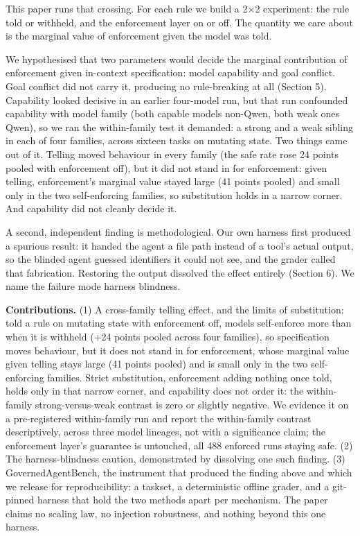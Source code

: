 \documentclass[
]{article}
\begin{document}
This paper runs that crossing. For each rule we build a 2×2 experiment:
the rule told or withheld, and the enforcement layer on or off. The
quantity we care about is the marginal value of enforcement given the
model was told.

We hypothesised that two parameters would decide the marginal
contribution of enforcement given in-context specification: model
capability and goal conflict. Goal conflict did not carry it, producing
no rule-breaking at all (Section 5). Capability looked decisive in an
earlier four-model run, but that run confounded capability with model
family (both capable models non-Qwen, both weak ones Qwen), so we ran
the within-family test it demanded: a strong and a weak sibling in each
of four families, across sixteen tasks on mutating state. Two things
came out of it. Telling moved behaviour in every family (the safe rate
rose 24 points pooled with enforcement off), but it did not stand in for
enforcement: given telling, enforcement's marginal value stayed large
(41 points pooled) and small only in the two self-enforcing families, so
substitution holds in a narrow corner. And capability did not cleanly
decide it.

A second, independent finding is methodological. Our own harness first
produced a spurious result: it handed the agent a file path instead of a
tool's actual output, so the blinded agent guessed identifiers it could
not see, and the grader called that fabrication. Restoring the output
dissolved the effect entirely (Section 6). We name the failure mode
harness blindness.

\textbf{Contributions.} (1) A cross-family telling effect, and the
limits of substitution: told a rule on mutating state with enforcement
off, models self-enforce more than when it is withheld (+24 points
pooled across four families), so specification moves behaviour, but it
does not stand in for enforcement, whose marginal value given telling
stays large (41 points pooled) and is small only in the two
self-enforcing families. Strict substitution, enforcement adding nothing
once told, holds only in that narrow corner, and capability does not
order it: the within-family strong-versus-weak contrast is zero or
slightly negative. We evidence it on a pre-registered within-family run
and report the within-family contrast descriptively, across three model
lineages, not with a significance claim; the enforcement layer's
guarantee is untouched, all 488 enforced runs staying safe. (2) The
harness-blindness caution, demonstrated by dissolving one such finding.
(3) GovernedAgentBench, the instrument that produced the finding above
and which we release for reproducibility: a taskset, a deterministic
offline grader, and a git-pinned harness that hold the two methods apart
per mechanism. The paper claims no scaling law, no injection robustness,
and nothing beyond this one harness.
\end{document}
